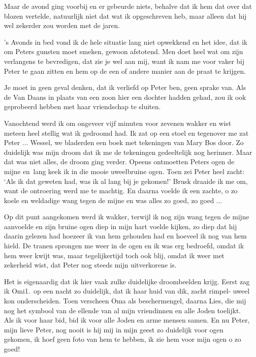 \documentclass{book}
\begin{document}
Maar de avond ging voorbij en er gebeurde niets, behalve dat ik hem dat
over dat blozen vertelde, natuurlijk niet dat wat ik opgeschreven heb,
maar alleen dat hij wel zekerder zou worden met de jaren.

's Avonds in bed vond ik de hele situatie lang niet opwekkend en het
idee, dat ik om Peters gunsten moet smeken, gewoon afstotend. Men doet
heel wat om zijn verlangens te bevredigen, dat zie je wel aan mij, want
ik nam me voor vaker bij Peter te gaan zitten en hem op de een of andere
manier aan de praat te krijgen.

Je moet in geen geval denken, dat ik verliefd op Peter ben, geen sprake
van. Als de Van Daans in plaats van een zoon hier een dochter hadden
gehad, zou ik ook geprobeerd hebben met haar vriendschap te sluiten.

Vanochtend werd ik om ongeveer vijf minuten voor zevenen wakker en wist
meteen heel stellig wat ik gedroomd had. Ik zat op een stoel en
tegenover me zat Peter ... Wessel, we bladerden een boek met tekeningen
van Mary Bos door. Zo duidelijk was mijn droom dat ik me de tekeningen
gedeeltelijk nog herinner. Maar dat was niet alles, de droom ging
verder. Opeens ontmoetten Peters ogen de mijne en~lang keek ik in die
mooie uweelbruine ogen. Toen zei Peter heel zacht: `Als ik dat geweten
had, was ik al lang bij je gekomen!' Brusk draaide ik me om, want de
ontroering werd me te machtig. En daarna voelde ik een zachte, o zo
koele en weldadige wang tegen de mijne en was alles zo goed, zo goed ...

Op dit punt aangekomen werd ik wakker, terwijl ik nog zijn wang tegen de
mijne aanvoelde en zijn bruine ogen diep in mijn hart voelde kijken, zo
diep dat hij daarin gelezen had hoezeer ik van hem gehouden had en
hoeveel ik nog van hem hield. De tranen sprongen me weer in de ogen en
ik was erg bedroefd, omdat ik hem weer kwijt was, maar tegelijkertijd
toch ook blij, omdat ik weer met zekerheid wist, dat Peter nog steeds
mijn uitverkorene is.

Het is eigenaardig dat ik hier vaak zulke duidelijke droombeelden krijg.
Eerst zag ik Omi1.~op een nacht zo duidelijk, dat ik haar huid van dik,
zacht rimpel- uweel kon onderscheiden. Toen verscheen Oma als
beschermengel, daarna Lies, die mij nog het symbool van de ellende van
al mijn vriendinnen en alle Joden toelijkt. Als ik voor haar bid, bid ik
voor alle Joden en arme mensen samen. En nu Peter, mijn lieve Peter, nog
nooit is hij mij in mijn geest zo duidelijk voor ogen gekomen, ik hoef
geen foto van hem te hebben, ik zie hem voor mijn ogen o zo goed!
\end{document}
